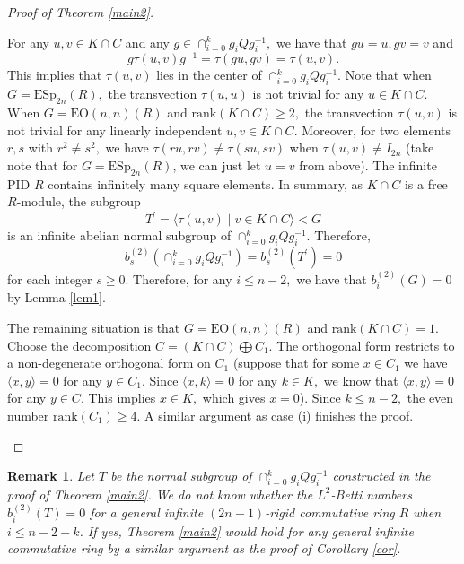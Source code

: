 \documentclass{gtpart}     %
\newtheorem{remark}[theorem]{Remark}
\begin{document}
\begin{proof}[Proof of Theorem \protect\ref{main2}]
\begin{description}
\item For any $u,v\in K\cap C$ and any $g\in \cap _{i=0}^{k}g_{i}Qg_{i}^{-1},
$ we have that $gu=u,gv=v$ and
\begin{equation*}
g\tau (u,v)g^{-1}=\tau (gu,gv)=\tau (u,v).
\end{equation*}%
This implies that $\tau (u,v)$ lies in the center of $\cap
_{i=0}^{k}g_{i}Qg_{i}^{-1}.$ Note that when $G=\mathrm{ESp}_{2n}(R),$ the
transvection $\tau (u,u)$ is not trivial for any $u\in K\cap C$. When $G=%
\mathrm{EO}(n,n)(R)$ and $\mathrm{rank}(K\cap C)\geq 2,$ the transvection $%
\tau (u,v)$ is not trivial for any linearly independent $u,v\in K\cap C$.
Moreover, for two elements $r,s$ with $r^{2}\neq s^{2},$ we have $\tau
(ru,rv)\neq \tau (su,sv)$ when $\tau (u,v)\neq I_{2n}$ (take note that for $%
G=\mathrm{ESp}_{2n}(R)$, we can just let $u=v$ from above). The infinite PID
$R$ contains infinitely many square elements. In summary, as $K\cap C$ is a
free $R$-module, the subgroup
\begin{equation*}
T^{\prime }=\langle \tau (u,v)\mid v\in K\cap C\rangle <G
\end{equation*}%
is an infinite abelian normal subgroup of $\cap _{i=0}^{k}g_{i}Qg_{i}^{-1}.$
Therefore,%
\begin{equation*}
b_{s}^{(2)}(\cap _{i=0}^{k}g_{i}Qg_{i}^{-1})=b_{s}^{(2)}(T^{\prime })=0
\end{equation*}%
for each integer $s\geq 0$. Therefore, for any $i\leq n-2,$ we have that $%
b_{i}^{(2)}(G)=0$ by Lemma \ref{lem1}.

The remaining situation is that $G=\mathrm{EO}(n,n)(R)$ and $\mathrm{rank}%
(K\cap C)=1.$ Choose the decomposition $C=(K\cap C)\bigoplus C_{1}.$ The
orthogonal form restricts to a non-degenerate orthogonal form on $C_{1}$
(suppose that for some $x\in C_{1}$ we have $\langle x,y\rangle =0$ for any $%
y\in C_{1}$. Since $\langle x,k\rangle =0$ for any $k\in K,$ we know that $%
\langle x,y\rangle =0$ for any $y\in C.$ This implies $x\in K,$ which gives $%
x=0$). Since $k\leq n-2,$ the even number $\mathrm{rank}(C_{1})\geq 4.$ A
similar argument as case (i) finishes the proof.
\end{description}
\end{proof}

\begin{remark}
\label{nrm} Let $T$ be the normal subgroup of $\cap
_{i=0}^{k}g_{i}Qg_{i}^{-1}$ constructed in the proof of Theorem \ref{main2}.
We do not know whether the $L^{2}$-Betti numbers $b_{i}^{(2)}(T)=0$ for a
general infinite $(2n-1)$-rigid commutative ring $R$ when $i\leq n-2-k$. If
yes, Theorem \ref{main2} would hold for any general infinite commutative
ring by a similar argument as the proof of Corollary \ref{cor}.
\end{remark}
\end{document}
